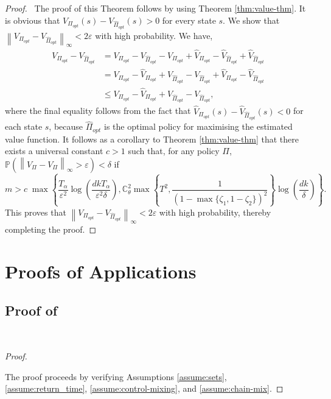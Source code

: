 \documentclass[opre,sglanonrev]{informs4}
\numberwithin{equation}{section}
\newcommand{\lp}{\left(}
\newcommand{\rp}{\right)}
\newcommand{\lc}{\left\{}
\newcommand{\rc}{\right\}}
\newcommand{\lV}{\left\|}
\newcommand{\rV}{\right\|}
\newcommand{\Cbb}{\mathbb{C}}
\newcommand{\Pbb}{\mathbb{P}}
\newcommand{\constant}{\Cbb}
\newcommand{\prob}{\Pbb}
\newcommand{\eps}{\varepsilon}
\renewcommand{\epsilon}{\eps}
\begin{document}
\begin{APPENDICES}
\begin{proof}\ 
The proof of this Theorem follows by using Theorem \ref{thm:value-thm}. It is obvious that $V_{\Pi_{opt}}(s) - V_{\hat \Pi_{opt}}(s)>0$ for every state $s$. We show that $\lV V_{\Pi_{opt}} - V_{\hat \Pi_{opt}}\rV_{\infty}<2\eps$ with high probability. We have,
\begin{align*}
    V_{\Pi_{opt}} - V_{\hat \Pi_{opt}} & = V_{\Pi_{opt}} - V_{\hat \Pi_{opt}}-\hat V_{\Pi_{opt}} + \hat V_{\Pi_{opt}}-\hat V_{\hat \Pi_{opt}} +\hat V_{\hat \Pi_{opt}}\\
    & = V_{\Pi_{opt}} - \hat V_{\Pi_{opt}} +\hat V_{\hat \Pi_{opt}} - V_{\hat \Pi_{opt}} +  \hat V_{\Pi_{opt}}-\hat V_{\hat \Pi_{opt}}\\
    & \leq V_{\Pi_{opt}} - \hat V_{\Pi_{opt}} +\hat V_{\hat \Pi_{opt}} - V_{\hat \Pi_{opt}},
\end{align*}
    where the final equality follows from the fact that $\hat V_{\Pi_{opt}}(s)-\hat V_{\hat \Pi_{opt}}(s)<0$ for each state $s$, because $\hat \Pi_{opt}$ is the optimal policy for maximising the estimated value function. 
    It follows as a corollary to Theorem \ref{thm:value-thm} that there exists a universal constant $c>1$ such that, for any policy $\Pi$, $\prob\lp\lV \hat V_\Pi - V_\Pi\rV_\infty>\eps\rp<\delta
$ if
\[ 
m>c \; \max\left\{\frac{T_\alpha}{\eps^2}\log\lp\frac{dkT_\alpha}{\epsilon^2\delta} \rp, \constant_\theta^2\max\lc {T}^2, \frac{1}{\lp 1-\max\{\zeta_1,1-\zeta_2\}\rp^2}\rc \log\lp \frac{dk}{\delta} \rp\right\}.
\]
This proves that $\lV V_{\Pi_{opt}} - V_{\hat \Pi_{opt}}\rV_{\infty}<2\eps$ with high probability, thereby completing the proof.
\end{proof}

\section{Proofs of Applications}
\subsection{Proof of }~\label{prf:sta-mdp}
\begin{proof} \ 

The proof proceeds by verifying Assumptions \ref{assume:sets}, \ref{assume:return_time},  \ref{assume:control-mixing}, and \ref{assume:chain-mix}. 


\end{proof}
\end{APPENDICES}
\end{document}
